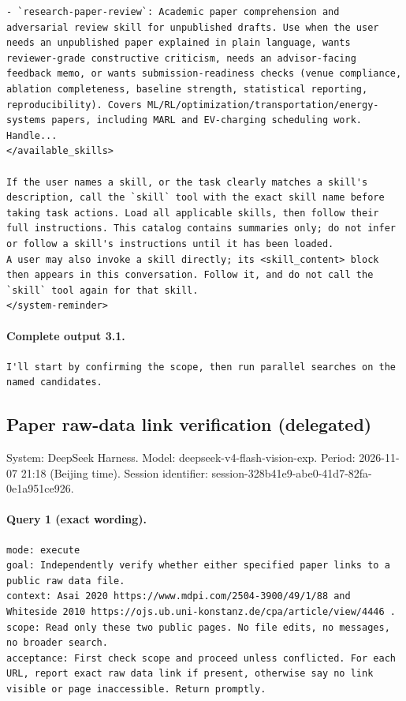 \documentclass[UTF8,10pt]{ctexart}
\begin{document}
\begin{Verbatim}[breaklines=true,breakanywhere=true,fontsize=\scriptsize,frame=single,framesep=2pt]
- `research-paper-review`: Academic paper comprehension and adversarial review skill for unpublished drafts. Use when the user needs an unpublished paper explained in plain language, wants reviewer-grade constructive criticism, needs an advisor-facing feedback memo, or wants submission-readiness checks (venue compliance, ablation completeness, baseline strength, statistical reporting, reproducibility). Covers ML/RL/optimization/transportation/energy-systems papers, including MARL and EV-charging scheduling work. Handle...
</available_skills>

If the user names a skill, or the task clearly matches a skill's description, call the `skill` tool with the exact skill name before taking task actions. Load all applicable skills, then follow their full instructions. This catalog contains summaries only; do not infer or follow a skill's instructions until it has been loaded.
A user may also invoke a skill directly; its <skill_content> block then appears in this conversation. Follow it, and do not call the `skill` tool again for that skill.
</system-reminder>
\end{Verbatim}

\paragraph{Complete output 3.1.}
\begin{Verbatim}[breaklines=true,breakanywhere=true,fontsize=\scriptsize,frame=single,framesep=2pt]
I'll start by confirming the scope, then run parallel searches on the named candidates.
\end{Verbatim}

\subsection*{Paper raw-data link verification (delegated)}
\noindent System: DeepSeek Harness. Model: deepseek-v4-flash-vision-exp. Period: 2026-11-07 21:18 (Beijing time). Session identifier: session-328b41e9-abe0-41d7-82fa-0e1a951ce926.

\paragraph{Query 1 (exact wording).}
\begin{Verbatim}[breaklines=true,breakanywhere=true,fontsize=\scriptsize,frame=single,framesep=2pt]
mode: execute
goal: Independently verify whether either specified paper links to a public raw data file.
context: Asai 2020 https://www.mdpi.com/2504-3900/49/1/88 and Whiteside 2010 https://ojs.ub.uni-konstanz.de/cpa/article/view/4446 .
scope: Read only these two public pages. No file edits, no messages, no broader search.
acceptance: First check scope and proceed unless conflicted. For each URL, report exact raw data link if present, otherwise say no link visible or page inaccessible. Return promptly.
\end{Verbatim}
\end{document}
